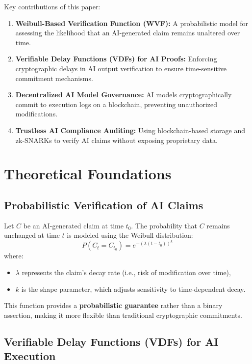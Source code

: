 \documentclass[12pt]{report}
\begin{document}
Key contributions of this paper:
\begin{enumerate}
    \item \textbf{Weibull-Based Verification Function (WVF):} A probabilistic model for assessing the likelihood that an AI-generated claim remains unaltered over time.
    \item \textbf{Verifiable Delay Functions (VDFs) for AI Proofs:} Enforcing cryptographic delays in AI output verification to ensure time-sensitive commitment mechanisms.
    \item \textbf{Decentralized AI Model Governance:} AI models cryptographically commit to execution logs on a blockchain, preventing unauthorized modifications.
    \item \textbf{Trustless AI Compliance Auditing:} Using blockchain-based storage and zk-SNARKs to verify AI claims without exposing proprietary data.
\end{enumerate}

\section{Theoretical Foundations}

\subsection{Probabilistic Verification of AI Claims}

Let \( C \) be an AI-generated claim at time \( t_0 \). The probability that \( C \) remains unchanged at time \( t \) is modeled using the Weibull distribution:
\[
P(C_t = C_{t_0}) = e^{-(\lambda (t - t_0))^k}
\]
where:
\begin{itemize}
    \item \( \lambda \) represents the claim's decay rate (i.e., risk of modification over time),
    \item \( k \) is the shape parameter, which adjusts sensitivity to time-dependent decay.
\end{itemize}
This function provides a \textbf{probabilistic guarantee} rather than a binary assertion, making it more flexible than traditional cryptographic commitments.

\subsection{Verifiable Delay Functions (VDFs) for AI Execution}
\end{document}
